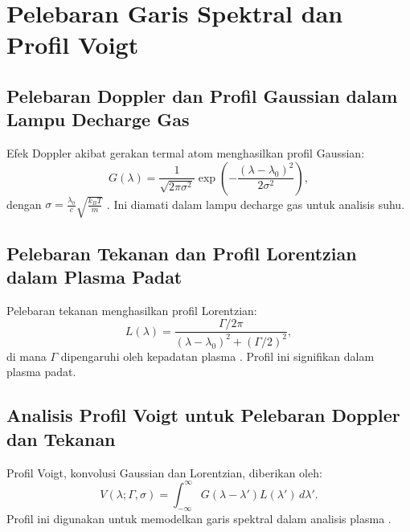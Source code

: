 \section{Pelebaran Garis Spektral dan Profil Voigt}
\subsection{Pelebaran Doppler dan Profil Gaussian dalam Lampu Decharge Gas}
Efek Doppler akibat gerakan termal atom menghasilkan profil Gaussian:
\begin{equation}
G(\lambda) = \frac{1}{\sqrt{2\pi \sigma^2}} \exp\left(-\frac{(\lambda - \lambda_0)^2}{2\sigma^2}\right),
\end{equation}
dengan $\sigma = \frac{\lambda_0}{c} \sqrt{\frac{k_B T}{m}}$ \citep{Demtroder2010}. Ini diamati dalam lampu decharge gas untuk analisis suhu.

\subsection{Pelebaran Tekanan dan Profil Lorentzian dalam Plasma Padat}
Pelebaran tekanan menghasilkan profil Lorentzian:
\begin{equation}
L(\lambda) = \frac{\Gamma / 2\pi}{(\lambda - \lambda_0)^2 + (\Gamma / 2)^2},
\end{equation}
di mana $\Gamma$ dipengaruhi oleh kepadatan plasma \citep{Demtroder2010}. Profil ini signifikan dalam plasma padat.

\subsection{Analisis Profil Voigt untuk Pelebaran Doppler dan Tekanan}
Profil Voigt, konvolusi Gaussian dan Lorentzian, diberikan oleh:
\begin{equation}
V(\lambda; \Gamma, \sigma) = \int_{-\infty}^{\infty} G(\lambda - \lambda') L(\lambda') \, d\lambda'.
\end{equation}
Profil ini digunakan untuk memodelkan garis spektral dalam analisis plasma \citep{Mason2015}.


